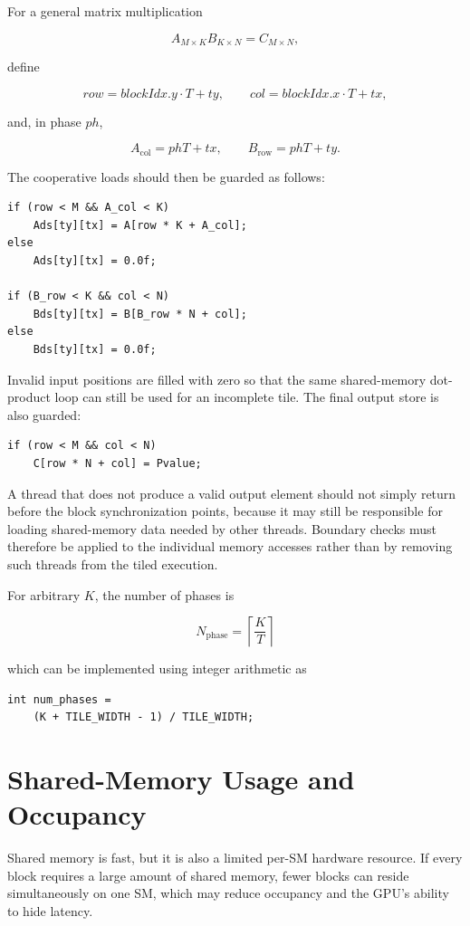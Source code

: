\documentclass[11pt,a4paper]{article}
\begin{document}
For a general matrix multiplication

\[
A_{M\times K}B_{K\times N}=C_{M\times N},
\]

define

\[
row=blockIdx.y\cdot T+ty,
\qquad
col=blockIdx.x\cdot T+tx,
\]

and, in phase $ph$,

\[
A_{\mathrm{col}}=phT+tx,
\qquad
B_{\mathrm{row}}=phT+ty.
\]

The cooperative loads should then be guarded as follows:

\begin{lstlisting}
if (row < M && A_col < K)
    Ads[ty][tx] = A[row * K + A_col];
else
    Ads[ty][tx] = 0.0f;

if (B_row < K && col < N)
    Bds[ty][tx] = B[B_row * N + col];
else
    Bds[ty][tx] = 0.0f;
\end{lstlisting}

Invalid input positions are filled with zero so that the same shared-memory dot-product loop can still be used for an incomplete tile. The final output store is also guarded:

\begin{lstlisting}
if (row < M && col < N)
    C[row * N + col] = Pvalue;
\end{lstlisting}

A thread that does not produce a valid output element should not simply return before the block synchronization points, because it may still be responsible for loading shared-memory data needed by other threads. Boundary checks must therefore be applied to the individual memory accesses rather than by removing such threads from the tiled execution.

For arbitrary $K$, the number of phases is

\[
\boxed{
N_{\mathrm{phase}}
=
\left\lceil \frac{K}{T}\right\rceil
}
\]

which can be implemented using integer arithmetic as

\begin{lstlisting}
int num_phases =
    (K + TILE_WIDTH - 1) / TILE_WIDTH;
\end{lstlisting}

\section{Shared-Memory Usage and Occupancy}

Shared memory is fast, but it is also a limited per-SM hardware resource. If every block requires a large amount of shared memory, fewer blocks can reside simultaneously on one SM, which may reduce occupancy and the GPU's ability to hide latency.
\end{document}

